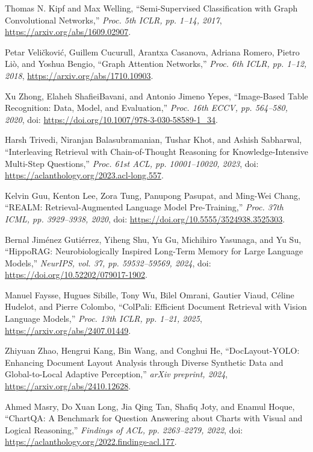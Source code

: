  Thomas N. Kipf and Max Welling, ``Semi-Supervised Classification with Graph Convolutional Networks,'' \emph{Proc. 5th ICLR, pp. 1--14, 2017}, \url{https://arxiv.org/abs/1609.02907}.

 Petar Veličković, Guillem Cucurull, Arantxa Casanova, Adriana Romero, Pietro Liò, and Yoshua Bengio, ``Graph Attention Networks,'' \emph{Proc. 6th ICLR, pp. 1--12, 2018}, \url{https://arxiv.org/abs/1710.10903}.

 Xu Zhong, Elaheh ShafieiBavani, and Antonio Jimeno Yepes, ``Image-Based Table Recognition: Data, Model, and Evaluation,'' \emph{Proc. 16th ECCV, pp. 564--580, 2020}, doi: \url{https://doi.org/10.1007/978-3-030-58589-1\_34}.

 Harsh Trivedi, Niranjan Balasubramanian, Tushar Khot, and Ashish Sabharwal, ``Interleaving Retrieval with Chain-of-Thought Reasoning for Knowledge-Intensive Multi-Step Questions,'' \emph{Proc. 61st ACL, pp. 10001--10020, 2023}, doi: \url{https://aclanthology.org/2023.acl-long.557}.

 Kelvin Guu, Kenton Lee, Zora Tung, Panupong Pasupat, and Ming-Wei Chang, ``REALM: Retrieval-Augmented Language Model Pre-Training,'' \emph{Proc. 37th ICML, pp. 3929--3938, 2020}, doi: \url{https://doi.org/10.5555/3524938.3525303}.

 Bernal Jiménez Gutiérrez, Yiheng Shu, Yu Gu, Michihiro Yasunaga, and Yu Su, ``HippoRAG: Neurobiologically Inspired Long-Term Memory for Large Language Models,'' \emph{NeurIPS, vol. 37, pp. 59532--59569, 2024}, doi: \url{https://doi.org/10.52202/079017-1902}.

 Manuel Faysse, Hugues Sibille, Tony Wu, Bilel Omrani, Gautier Viaud, Céline Hudelot, and Pierre Colombo, ``ColPali: Efficient Document Retrieval with Vision Language Models,'' \emph{Proc. 13th ICLR, pp. 1--21, 2025}, \url{https://arxiv.org/abs/2407.01449}.

 Zhiyuan Zhao, Hengrui Kang, Bin Wang, and Conghui He, ``DocLayout-YOLO: Enhancing Document Layout Analysis through Diverse Synthetic Data and Global-to-Local Adaptive Perception,'' \emph{arXiv preprint, 2024}, \url{https://arxiv.org/abs/2410.12628}.

 Ahmed Masry, Do Xuan Long, Jia Qing Tan, Shafiq Joty, and Enamul Hoque, ``ChartQA: A Benchmark for Question Answering about Charts with Visual and Logical Reasoning,'' \emph{Findings of ACL, pp. 2263--2279, 2022}, doi: \url{https://aclanthology.org/2022.findings-acl.177}.

